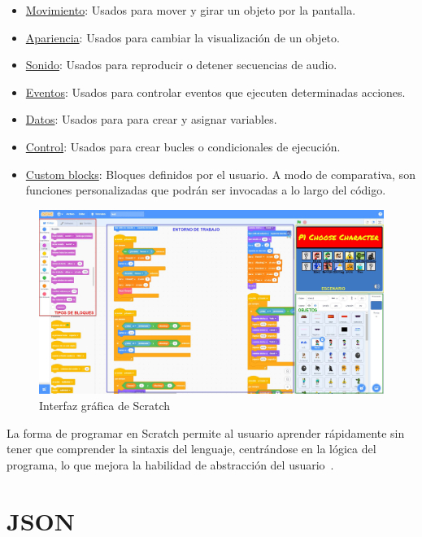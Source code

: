 \documentclass[a4paper, 12pt]{book}
\begin{document}
\begin{itemize}
  	\item \underline{Movimiento}: Usados para mover y girar un objeto por la pantalla.
  	\item \underline{Apariencia}: Usados para cambiar la visualización de un objeto.
  	\item \underline{Sonido}: Usados para reproducir o detener secuencias de audio.
  	\item \underline{Eventos}: Usados para controlar eventos que ejecuten determinadas acciones.
  	\item \underline{Datos}: Usados para para crear y asignar variables.
  	\item \underline{Control}: Usados para crear bucles o condicionales de ejecución.
  	\item \underline{Custom blocks}: Bloques definidos por el usuario. A modo de comparativa, son funciones personalizadas que podrán ser invocadas a lo largo del código.
\end{itemize}

\begin{figure}[htb!]
\centering
\includegraphics[width=17cm, keepaspectratio]{img/scratch.jpg}
\caption{Interfaz gráfica de Scratch}
\label{fig:scratch}
\end{figure}

La forma de programar en Scratch permite al usuario aprender rápidamente sin tener que comprender la sintaxis del lenguaje, centrándose en la lógica del programa, lo que mejora la habilidad de abstracción del usuario~\cite{arotuma2017programacion}.

\section{JSON}
\label{sec:Json}
\end{document}

